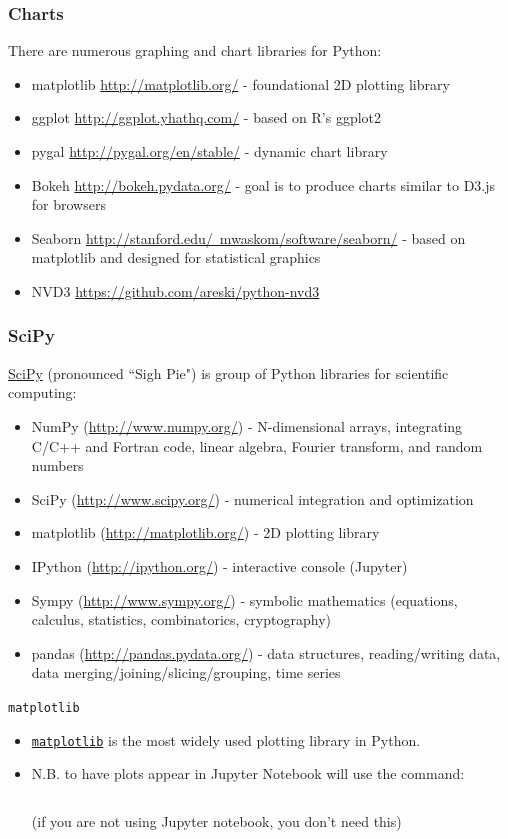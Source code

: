\documentclass[xcolor=svgnames, handout]{beamer}
\newcommand{\nl}{\\[1em]}
\newcommand{\ft}[1]{\frametitle{#1}}
\begin{document}
\begin{frame}[fragile]\ft{Charts}
There are numerous graphing and chart libraries for Python:
\begin{itemize}
\item matplotlib \href{http://matplotlib.org/}{http://matplotlib.org/} - foundational 2D plotting library
\item ggplot \href{http://ggplot.yhathq.com/}{http://ggplot.yhathq.com/} - based on R's ggplot2
\item pygal \href{http://pygal.org/en/stable/}{http://pygal.org/en/stable/} - dynamic chart library
\item Bokeh \href{http://bokeh.pydata.org/}{http://bokeh.pydata.org/} -  goal is to produce charts similar to D3.js for browsers
\item Seaborn \href{http://stanford.edu/~mwaskom/software/seaborn/}{http://stanford.edu/~mwaskom/software/seaborn/} - based on matplotlib and designed for statistical graphics
\item NVD3 \href{https://github.com/areski/python-nvd3}{https://github.com/areski/python-nvd3}
\end{itemize}
\end{frame}

\begin{frame}\ft{SciPy}
\href{https://www.scipy.org/}{SciPy} (pronounced ``Sigh Pie") is group of Python libraries for scientific computing: 
\begin{itemize}
\item NumPy (\url{http://www.numpy.org/}) - N-dimensional arrays, integrating C/C++ and Fortran code, linear algebra,  Fourier transform, and random numbers
\item SciPy (\url{http://www.scipy.org/}) - numerical integration and optimization
\item matplotlib (\url{http://matplotlib.org/}) - 2D plotting library
\item IPython (\url{http://ipython.org/}) - interactive console (Jupyter)
\item Sympy (\url{http://www.sympy.org/}) - symbolic mathematics (equations, calculus, statistics, combinatorics, cryptography)
\item pandas (\url{http://pandas.pydata.org/}) - data structures, reading/writing data, data merging/joining/slicing/grouping, time series

\end{itemize}
\end{frame}

%
\begin{frame}[fragile]{\tt matplotlib}
\begin{itemize}
\item \href{https://matplotlib.org/}{\tt matplotlib} is the most widely used plotting library in Python.\nl

\item N.B.  to have plots appear in Jupyter Notebook will use the command: 
\begin{Verbatim}[frame=single]
%matplotlib inline
\end{Verbatim}
 (if you are not using Jupyter notebook, you don't need this)\nl
\end{itemize}
\end{frame}
\end{document}
